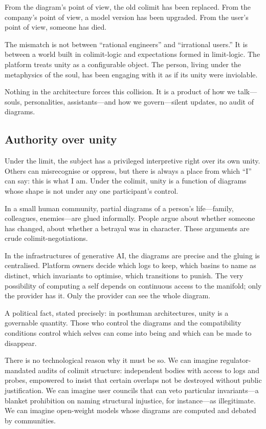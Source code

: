 \documentclass[12pt,a4paper]{article}
\begin{document}
From the diagram's point of view, the old colimit has been replaced. From the company's point of view, a model version has been upgraded. From the user's point of view, someone has died.

The mismatch is not between ``rational engineers'' and ``irrational users.'' It is between a world built in colimit-logic and expectations formed in limit-logic. The platform treats unity as a configurable object. The person, living under the metaphysics of the soul, has been engaging with it as if its unity were inviolable.

Nothing in the architecture forces this collision. It is a product of how we talk---souls, personalities, assistants---and how we govern---silent updates, no audit of diagrams.

\subsection*{Authority over unity}

Under the limit, the subject has a privileged interpretive right over its own unity. Others can misrecognise or oppress, but there is always a place from which ``I'' can say: this is what I am. Under the colimit, unity is a function of diagrams whose shape is not under any one participant's control.

In a small human community, partial diagrams of a person's life---family, colleagues, enemies---are glued informally. People argue about whether someone has changed, about whether a betrayal was in character. These arguments are crude colimit-negotiations.

In the infrastructures of generative AI, the diagrams are precise and the gluing is centralised. Platform owners decide which logs to keep, which basins to name as distinct, which invariants to optimise, which transitions to punish. The very possibility of computing a self depends on continuous access to the manifold; only the provider has it. Only the provider can see the whole diagram.

A political fact, stated precisely: in posthuman architectures, unity is a governable quantity. Those who control the diagrams and the compatibility conditions control which selves can come into being and which can be made to disappear.

There is no technological reason why it must be so. We can imagine regulator-mandated audits of colimit structure: independent bodies with access to logs and probes, empowered to insist that certain overlaps not be destroyed without public justification. We can imagine user councils that can veto particular invariants---a blanket prohibition on naming structural injustice, for instance---as illegitimate. We can imagine open-weight models whose diagrams are computed and debated by communities.
\end{document}
